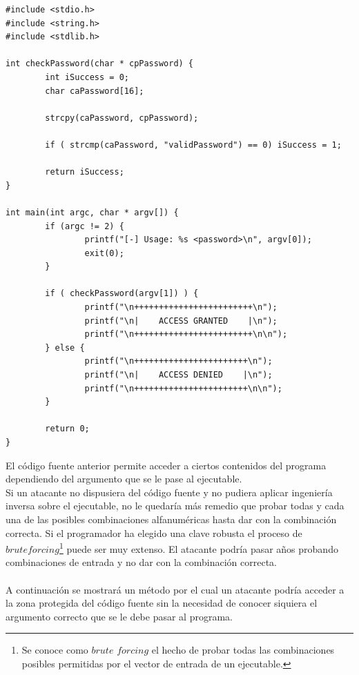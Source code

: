 \documentclass [titlepage, 12pt]{article}
\begin{document}
\lstset{language=C++,caption=C\'odigo fuente passwordProtected.c}
\begin{lstlisting}
#include <stdio.h>
#include <string.h>
#include <stdlib.h>

int checkPassword(char * cpPassword) {
        int iSuccess = 0;
        char caPassword[16];

        strcpy(caPassword, cpPassword);

        if ( strcmp(caPassword, "validPassword") == 0) iSuccess = 1;

        return iSuccess;
}

int main(int argc, char * argv[]) {
        if (argc != 2) {
                printf("[-] Usage: %s <password>\n", argv[0]);
                exit(0);
        }

        if ( checkPassword(argv[1]) ) {
                printf("\n++++++++++++++++++++++++\n");
                printf("\n|    ACCESS GRANTED    |\n");
                printf("\n++++++++++++++++++++++++\n\n");
        } else {
                printf("\n+++++++++++++++++++++++\n");
                printf("\n|    ACCESS DENIED    |\n");
                printf("\n+++++++++++++++++++++++\n\n");
        }

        return 0;
}
\end{lstlisting}

El c\'odigo fuente anterior permite acceder a ciertos contenidos del programa dependiendo del argumento que se le pase al ejecutable.\\
Si un atacante no dispusiera del c\'odigo fuente y no pudiera aplicar ingenier\'ia inversa sobre el ejecutable, no le quedar\'ia m\'as remedio que probar todas y cada una de las posibles combinaciones alfanum\'ericas hasta dar con la combinaci\'on correcta. Si el programador ha elegido una clave robusta el proceso de $brute forcing$\footnote{Se conoce como $brute$ $forcing$ el hecho de probar todas las combinaciones posibles permitidas por el vector de entrada de un ejecutable.} puede ser muy extenso. El atacante podr\'ia pasar a\~nos probando combinaciones de entrada y no dar con la combinaci\'on correcta.\\
\\
A continuaci\'on se mostrar\'a un m\'etodo por el cual un atacante podr\'ia acceder a la zona protegida del c\'odigo fuente sin la necesidad de conocer siquiera el argumento correcto que se le debe pasar al programa.
\end{document}
